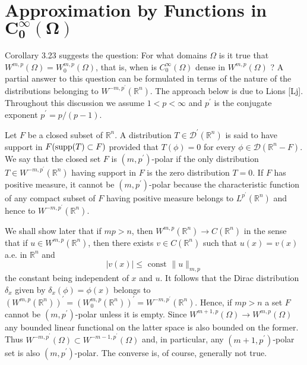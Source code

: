 \section[Approximation by Functions in $C_0^\infty (\Omega)$]%
  {Approximation by Functions in $\bm{C_0^\infty (\Omega)}$}


\begin{para}
  Corollary 3.23 suggests the question: For what domains $\Omega$ is it true
  that $W^{m,p}(\Omega)=W_0^{m, p}(\Omega)$, that is, when is $C_0^{\infty}(\Omega)$
  dense in $W^{m,p}(\Omega)$ ? A partial answer to this question can be formulated in terms of 
  the nature of the distributions belonging to $W^{-m, p^{\prime}}\left(\mathbb{R}^n\right)$.
  The approach below is due to Lions [Lj]. Throughout this discussion we assume $1<p<\infty$
  and $p^{\prime}$ is the conjugate exponent $p^{\prime}=p /(p-1)$.
\end{para}

\begin{para}
  Let $F$ be a closed subset of $\mathbb{R}^n$.
  A distribution $T \in \mathscr{D}^{\prime}\left(\mathbb{R}^n\right)$ is said to have support
  in $F(\operatorname{supp}(T) \subset F)$ provided that $T(\phi)=0$ for every
  $\phi \in \mathscr{D}\left(\mathbb{R}^n-F\right)$.
  We say that the closed set $F$ is $\left(m, p^{\prime}\right)$-polar if the only
  distribution $T \in W^{-m, p^{\prime}}\left(\mathbb{R}^n\right)$ having support in $F$ is
  the zero distribution $T=0$. If $F$ has positive measure,
  it cannot be $\left(m, p^{\prime}\right)$-polar because the characteristic function of any 
  compact subset of $F$ having positive measure belongs
  to $L^{p^{\prime}}\left(\mathbb{R}^n\right)$ and hence
  to $W^{-m, p^{\prime}}\left(\mathbb{R}^n\right)$.
\end{para}

We shall show later that if $m p>n$,
then $W^{m,p}\left(\mathbb{R}^n\right) \rightarrow C\left(\mathbb{R}^n\right)$ in the sense that 
if $u \in W^{m,p}\left(\mathbb{R}^n\right)$, then there exists $v \in C\left(\mathbb{R}^n\right)$ 
such that $u(x)=v(x)$ a.e. in $\mathbb{R}^n$ and
\[
|v(x)| \leq \text { const }\|u\|_{m,p}
\]
the constant being independent of $x$ and $u$. It follows that the Dirac distribution $\delta_x$ 
given by $\delta_x(\phi)=\phi(x)$ belongs to
$\left(W^{m,p}\left(\mathbb{R}^n\right)\right)^{\prime}=\left(W_0^{m, p}\left(\mathbb{R}^n\right)\right)^{\prime}=W^{-m, p^{\prime}}\left(\mathbb{R}^n\right)$.
Hence, if $m p>n$ a set $F$ cannot be $\left(m, p^{\prime}\right)$-polar unless it is empty.
Since $W^{m+1, p}(\Omega) \rightarrow W^{m,p}(\Omega)$ any bounded linear functional on the 
latter space is also bounded on the former.
Thus $W^{-m, p^{\prime}}(\Omega) \subset W^{-m-1, p^{\prime}}(\Omega)$ and, in particular,
any $\left(m+1, p^{\prime}\right)$-polar set is also $\left(m, p^{\prime}\right)$-polar.
The converse is, of course, generally not true.


